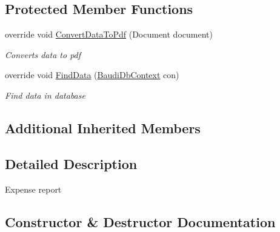 \subsection*{Protected Member Functions}
\begin{DoxyCompactItemize}
\item 
override void \hyperlink{class_baudi_1_1_client_1_1_reports_1_1_building_report_1_1_expense_report_1_1_expense_report_ace54ba9001f278058268c44f5856723d}{Convert\+Data\+To\+Pdf} (Document document)
\begin{DoxyCompactList}\small\item\em Converts data to pdf \end{DoxyCompactList}\item 
override void \hyperlink{class_baudi_1_1_client_1_1_reports_1_1_building_report_1_1_expense_report_1_1_expense_report_a71e76a5b8c09c3a8674b4c7aa7065929}{Find\+Data} (\hyperlink{class_baudi_1_1_d_a_l_1_1_baudi_db_context}{Baudi\+Db\+Context} con)
\begin{DoxyCompactList}\small\item\em Find data in database \end{DoxyCompactList}\end{DoxyCompactItemize}
\subsection*{Additional Inherited Members}


\subsection{Detailed Description}
Expense report 



\subsection{Constructor \& Destructor Documentation}
\hypertarget{class_baudi_1_1_client_1_1_reports_1_1_building_report_1_1_expense_report_1_1_expense_report_a7a48a52a906ad81ee040de78a4eea31e}{}
